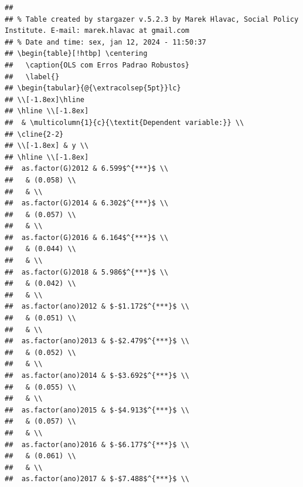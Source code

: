 \documentclass[
]{article}
\begin{document}
\begin{verbatim}
## 
## % Table created by stargazer v.5.2.3 by Marek Hlavac, Social Policy Institute. E-mail: marek.hlavac at gmail.com
## % Date and time: sex, jan 12, 2024 - 11:50:37
## \begin{table}[!htbp] \centering 
##   \caption{OLS com Erros Padrao Robustos} 
##   \label{} 
## \begin{tabular}{@{\extracolsep{5pt}}lc} 
## \\[-1.8ex]\hline 
## \hline \\[-1.8ex] 
##  & \multicolumn{1}{c}{\textit{Dependent variable:}} \\ 
## \cline{2-2} 
## \\[-1.8ex] & y \\ 
## \hline \\[-1.8ex] 
##  as.factor(G)2012 & 6.599$^{***}$ \\ 
##   & (0.058) \\ 
##   & \\ 
##  as.factor(G)2014 & 6.302$^{***}$ \\ 
##   & (0.057) \\ 
##   & \\ 
##  as.factor(G)2016 & 6.164$^{***}$ \\ 
##   & (0.044) \\ 
##   & \\ 
##  as.factor(G)2018 & 5.986$^{***}$ \\ 
##   & (0.042) \\ 
##   & \\ 
##  as.factor(ano)2012 & $-$1.172$^{***}$ \\ 
##   & (0.051) \\ 
##   & \\ 
##  as.factor(ano)2013 & $-$2.479$^{***}$ \\ 
##   & (0.052) \\ 
##   & \\ 
##  as.factor(ano)2014 & $-$3.692$^{***}$ \\ 
##   & (0.055) \\ 
##   & \\ 
##  as.factor(ano)2015 & $-$4.913$^{***}$ \\ 
##   & (0.057) \\ 
##   & \\ 
##  as.factor(ano)2016 & $-$6.177$^{***}$ \\ 
##   & (0.061) \\ 
##   & \\ 
##  as.factor(ano)2017 & $-$7.488$^{***}$ \\ 

\end{verbatim}
\end{document}
